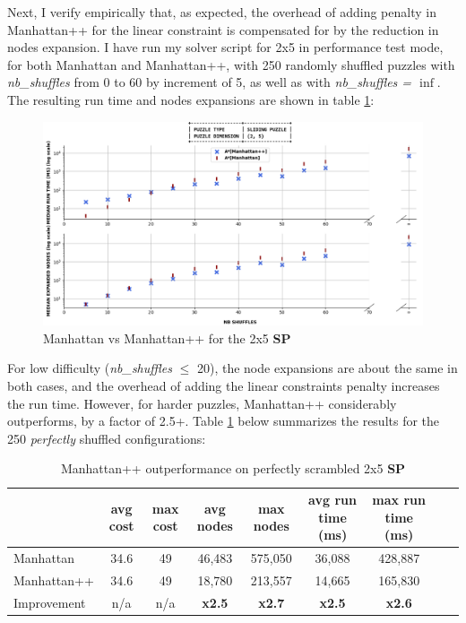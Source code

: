 \label{MHComp}
Next, I verify empirically that, as expected, the overhead of adding penalty in Manhattan++ for the linear constraint is compensated for by the reduction in nodes expansion. I have run my solver script for 2x5 in performance test mode, for both Manhattan and Manhattan++, with 250 randomly shuffled puzzles with \textit{nb\_shuffles} from 0 to 60 by increment of 5, as well as with \textit{nb\_shuffles = $\inf$}. The resulting run time and nodes expansions are shown in table \ref{fig:25SPPerformanceManhattan}:

\begin{figure}[H]
\centering
\includegraphics[scale=0.40]{./Figures/25SPPerformanceManhattan}
\caption[SP]{Manhattan vs Manhattan++ for the 2x5 \textbf{SP}}
\label{fig:25SPPerformanceManhattan}
\end{figure}

\noindent For low difficulty (\textit{nb\_shuffles} $\leq$ 20), the node expansions are about the same in both cases, and the overhead of adding the linear constraints penalty increases the run time. However, for harder puzzles, Manhattan++ considerably outperforms, by a factor of 2.5+. Table \ref{tab:mppOutperformance} below summarizes the results for the 250 \textit{perfectly} shuffled configurations:



\begin{table}[H]
\begin{center}
\begin{tabular}{l*{7}{c}r}
                              & avg cost  & max cost & avg nodes & max nodes & avg run time (ms) & max run time (ms) \\
\hline
Manhattan                   &  34.6  & 49 & 46,483 & 575,050 & 36,088 & 428,887 \\
Manhattan++              & 34.6 &  49 & 18,780 & 213,557 & 14,665 & 165,830 \\
Improvement               & n/a &  n/a & \textbf{x2.5} & \textbf{x2.7} & \textbf{x2.5} & \textbf{x2.6} \\
\end{tabular}
\caption{\label{tab:mppOutperformance} Manhattan++ outperformance on perfectly scrambled 2x5 \textbf{SP}}
\end{center}
\end{table}






